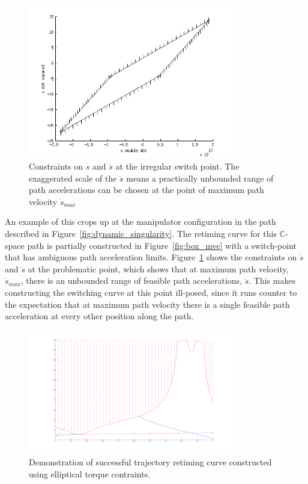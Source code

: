 \documentclass[letterpaper,10pt]{article} %
\begin{document}
\begin{figure}[h!]
\centering
\includegraphics[width=0.8\textwidth]{pics/box_constraints_at_switch}
\caption{Constraints on $\dot{s}$ and $\ddot{s}$ at the irregular switch point. The exaggerated scale of the $\ddot{s}$ means a practically unbounded range of path accelerations can be chosen at the point of maximum path velocity $\dot{s}_{max}$}
\label{fig:box_constraints}
\end{figure} 

An example of this crops up at the manipulator configuration in the path described in Figure~\ref{fig:dynamic_singularity}. The retiming curve for this $\mathbb{C}$-space path is partially constructed in Figure~\ref{fig:box_mvc} with a switch-point that has ambiguous path acceleration limits. Figure~\ref{fig:box_constraints} shows the constraints on $\dot{s}$ and $\ddot{s}$ at the problematic point, which shows that at maximum path velocity, $\dot{s}_{max}$, there is an unbounded range of feasible path accelerations, $\ddot{s}$. This makes constructing the switching curve at this point ill-posed, since it runs counter to the expectation that at maximum path velocity there is a single feasible path acceleration at every other position along the path.

\begin{figure}[h!]
\centering
\includegraphics[width=0.8\textwidth]{pics/bobrow_path}
\caption{Demonstration of successful trajectory retiming curve constructed using elliptical torque contraints.}
\label{fig:elliptical}
\end{figure}
\end{document}
